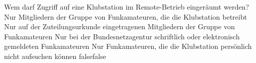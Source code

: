     {Wem darf Zugriff auf eine Klubstation im Remote-Betrieb eingeräumt werden?}
    {Nur Mitgliedern der Gruppe von Funkamateuren, die die Klubstation betreibt}
    {Nur auf der Zuteilungsurkunde eingetragenen Mitgliedern der Gruppe von Funkamateuren}
    {Nur bei der Bundesnetzagentur schriftlich oder elektronisch gemeldeten Funkamateuren}
    {Nur Funkamateuren, die die Klubstation persönlich nicht aufsuchen können}
    {false}{false}